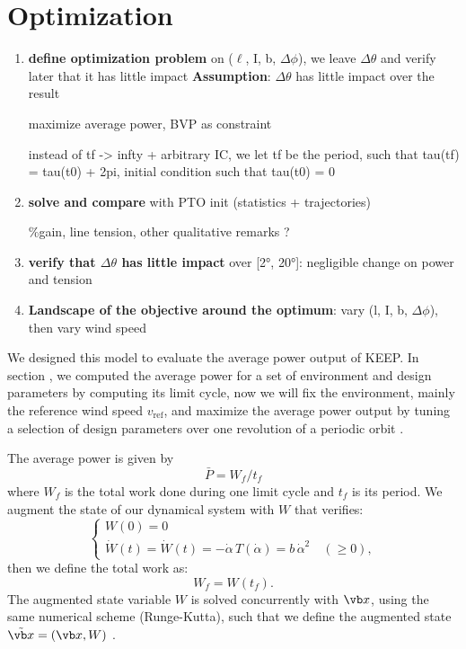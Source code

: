 \section{Optimization}
\begin{enumerate}
    \item \textbf{define optimization problem} on ($\ell$, I, b, $\Delta \phi$), we leave $\Delta \theta$ and verify later that it has little impact
    \textbf{Assumption}: $\Delta \theta$ has little impact over the result

    maximize average power, BVP as constraint

instead of tf -> infty + arbitrary IC, we let tf be the period, such that tau(tf) = tau(t0) + 2pi, initial condition such that tau(t0) = 0

\item \textbf{solve and compare} with PTO init (statistics + trajectories)

\%gain, line tension, other qualitative remarks ?

\item \textbf{verify that $\Delta \theta$ has little impact} over [2°, 20°]: negligible change on power and tension

\item \textbf{Landscape of the objective around the optimum}: vary (l, I, b, $\Delta \phi$), then vary wind speed
\end{enumerate}

We designed this model to evaluate the average power output of KEEP. In section , we computed the average power  for a set of environment and design parameters by computing its limit cycle, now we will fix the environment, mainly the reference wind speed \(v_\mathrm{ref}\), and maximize the average power output by tuning a selection of design parameters over one revolution of a periodic orbit .

The average power is given by
\begin{equation}
    \bar P = W_f/t_f
\end{equation} where \(W_f\) is the total work done during one limit cycle and \(t_f\) is its period. We augment the state of our dynamical system with \(W\) that verifies:
\begin{equation}
\begin{cases}
    W(0) = 0 \\
    \dot W(t) = \dot W(t) = - \dot \alpha \, T(\dot \alpha) = b \, \dot \alpha^2 \quad (\geq 0),
\end{cases}
\end{equation}
\alter{<<<<<<<<<<<<<<<<<<<}
then we define the total work as:
\begin{equation}
    W_f = W(t_f).
\end{equation}
The augmented state variable \(W\) is solved concurrently with \(\vb x\), using the same numerical scheme (Runge-Kutta), such that we define the augmented state \(\tilde{\vb x} = (\vb x, W) \) .

